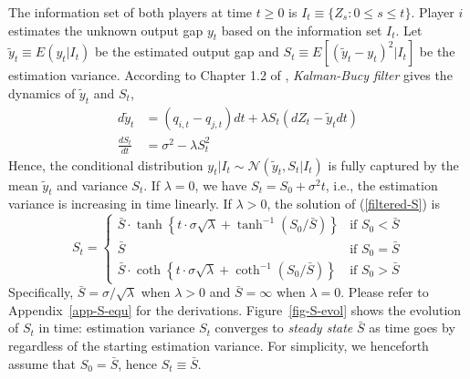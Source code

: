 \documentclass[mnsc]{informs3}
\begin{document}
The information set of both players at time $t \ge 0$ is  $I_{t} \equiv \{Z_{s} : 0\le s \le t\}$. 
Player $i$ estimates the unknown output gap $y_t$ based on the information set $I_t$. 
Let $\tilde{y}_t \equiv E(y_{t}|I_t)$ be the estimated output gap and $S_t \equiv E[(\tilde{y}_{t}-y_{t})^2|I_t]$ be the estimation variance. 
According to Chapter 1.2 of \citet{Bensoussan1992Control}, \textit{Kalman-Bucy filter} gives the dynamics of $\tilde{y}_{t}$ and $S_{t}$, 
\begin{align}
	d\tilde{y}_{t} &= (q_{i,t}-q_{j,t})dt + \lambda S_{t}(dZ_{t}-\tilde{y}_{t}dt) 
	\label{filtered-x}\\
	\frac{dS_{t}}{dt} &= \sigma^2 - \lambda S_{t}^2
	\label{filtered-S}
\end{align} 
Hence, the conditional distribution $y_{t}|I_t\sim\mathcal{N}(\tilde{y}_{t},S_{t}|I_t)$ is fully captured by the mean $\tilde{y}_{t}$ and variance $S_{t}$. 
If $\lambda = 0$, we have $S_t = S_0+\sigma^2t$, i.e., the estimation variance is increasing in time linearly. 
If $\lambda > 0$, the solution of (\ref{filtered-S}) is
\begin{equation}\label{S-evolution} 
	S_t = 
	\begin{cases}
        \bar{S} \cdot \tanh\left\{t\cdot\sigma\sqrt{\lambda} +  \tanh^{-1}\left(S_0\big/\bar{S}\right)\right\} & \text{if } S_0 < \bar{S} \\
        \bar{S} & \text{if } S_0 = \bar{S} \\
        \bar{S} \cdot \coth\left\{t\cdot\sigma\sqrt{\lambda} +  \coth^{-1}\left(S_0\big/\bar{S}\right)\right\} & \text{if } S_0 > \bar{S} 
	\end{cases}
\end{equation}
Specifically, $\bar{S} = \sigma / \sqrt{\lambda}$ when $\lambda>0$ and $\bar{S} = \infty$ when $\lambda = 0$. 
Please refer to Appendix~\ref{app-S-equ} for the derivations. 
Figure~\ref{fig-S-evol} shows the evolution of $S_t$ in time: estimation variance $S_t$ converges to \textit{steady state} $\bar{S}$ as time goes by regardless of the starting estimation variance. 
For simplicity, we henceforth assume that $S_0 = \bar{S}$, hence $S_t\equiv \bar{S}$. 
\end{document}
